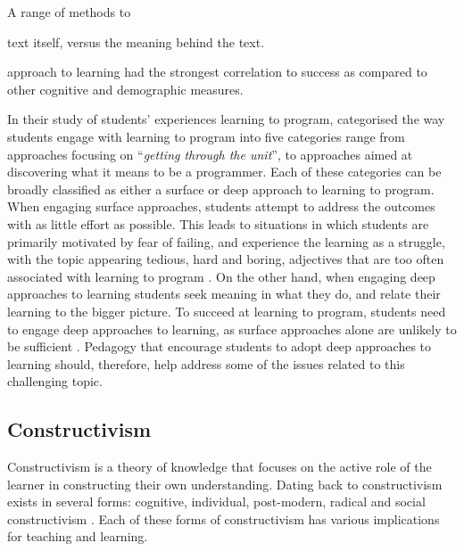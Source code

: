 A range of methods to 

text itself, versus the meaning behind the text. 

\cite{Marton:1984}




\cite{DeRaadt:2005} approach to learning  had the strongest correlation to success as compared to other cognitive and demographic measures.


In their study of students' experiences learning to program, \citet{Bruce:2003} categorised the way students engage with learning to program into five categories range from approaches focusing on ``\emph{getting through the unit}'', to approaches aimed at discovering what it means to be a programmer. Each of these categories can be broadly classified as either a surface or deep approach to learning \cite{Marton:1976a,Ramsden:1992} to program. When engaging surface approaches, students attempt to address the outcomes with as little effort as possible. This leads to situations in which students are primarily motivated by fear of failing, and experience the learning as a struggle, with the topic appearing tedious, hard and boring, adjectives that are too often associated with learning to program \cite{McGettrick:2005}. On the other hand, when engaging deep approaches to learning students seek meaning in what they do, and relate their learning to the bigger picture. To succeed at learning to program, students need to engage deep approaches to learning, as surface approaches alone are unlikely to be sufficient \cite{Bruce:2003}. Pedagogy that encourage students to adopt deep approaches to learning should, therefore, help address some of the issues related to this challenging topic.





\subsection{Constructivism} %
\label{sub:constructivism}

Constructivism is a theory of knowledge that focuses on the active role of the learner in constructing their own understanding. Dating back to \citet{Piaget:1950} constructivism exists in several forms: cognitive, individual, post-modern, radical and social constructivism \cite{Phillips:1995,Steffe:1995}. Each of these forms of constructivism has various implications for teaching and learning.



